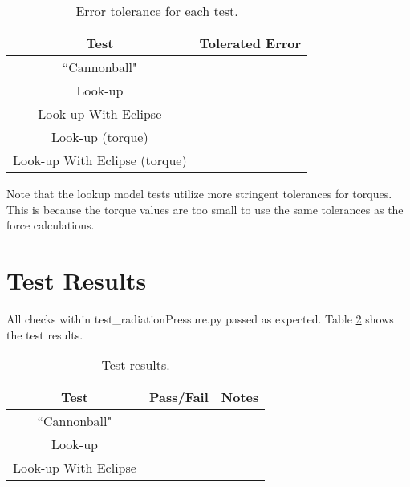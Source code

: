 \begin{table}[htbp]
	\caption{Error tolerance for each test.}
	\label{tab:errortol}
	\centering \fontsize{10}{10}\selectfont
	\begin{tabular}{ c | c } %
		\hline
		\textbf{Test}   	      	               & \textbf{Tolerated Error} 						           \\ \hline
		``Cannonball"                           &	 			  \\ \hline
		Look-up						                & 		   				\\ \hline
		Look-up With Eclipse	             &     \\ \hline
		Look-up	(torque)			               & 		   				\\ \hline
		Look-up With Eclipse (torque)	&     \\ \hline
	\end{tabular}
\end{table}

\noindent Note that the lookup model tests utilize more stringent tolerances for torques. This is because the torque values are too small to use the same tolerances as the force calculations.



\section{Test Results}

All checks within test\_radiationPressure.py passed as expected. Table \ref{tab:results} shows the test results.

\begin{table}[H]
	\caption{Test results.}
	\label{tab:results}
	\centering \fontsize{10}{10}\selectfont
	\begin{tabular}{c | c | c  } %
		\hline
		\textbf{Test} 				      & \textbf{Pass/Fail} 						   		   		 & \textbf{Notes} 									        \\ \hline
		``Cannonball"	   			  	&      	  & 	        \\ \hline
		Look-up	   	                     &              		&            		\\ \hline
		Look-up With Eclipse      &  &\\ \hline
	\end{tabular}
\end{table}
